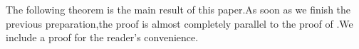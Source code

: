 \documentclass[SecEq,CM,GP]{degruyter-crelle} %
\theoremstyle{plain}
\newcommand{\homo}{{\rm Hom}}
\newcommand{\lrr}{{\langle r\rangle}}
\newcommand{\st}{{\rm St}}
\newcommand{\valua}{\mathrm val}
\newcommand{\bG}{{\mathbf{G}}}
\newcommand{\bL}{{\mathbf{L}}}
\newcommand{\bh}{{\mathbf{h}}}
\begin{document}
%
%
The following theorem is the main result of this paper.\;As soon as  we finish the previous preparation,\;the proof is almost completely parallel to the proof of \cite[Theorem 4.10]{2019DINGSimple}.\;We include a proof for the reader's convenience.\;
\end{document}
